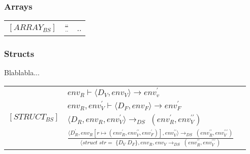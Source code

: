     
\noindent \subsubsection{Arrays}
    
\begin{semantik}
    \bgroup
    \def\arraystretch{3}
    \begin{table}[H]
    \centering
    \begin{tabular}{l c l}
        
        $[ARRAY_{BS}]$ & $
        \frac{..}
        {..}
        $ & .. \\
        
    \end{tabular}
    \end{table}
    \egroup
    \caption{Array}
    \label{sem:arrayvalue}
\end{semantik}
    
\noindent \subsubsection{Structs}
Blablabla... 
\begin{semantik}
    \bgroup
    \def\arraystretch{2}
    \begin{table}[H]
    \centering
    \begin{tabular}{l c l}
        
        \multirow{4}{*}{$[STRUCT_{BS}]$} &
        \multicolumn{1}{l}{$ env_R \vdash \langle D_V, env_V \rangle \rightarrow env_v^\prime$} \\
        
        & \multicolumn{1}{l}{$ env_R, env_V^\prime \vdash \langle D_F, env_F \rangle \rightarrow env_F^\prime $} \\
        
        & \multicolumn{1}{l}{$ \langle D_R, env_R, env_V^\prime \rangle \rightarrow_{DS}\;(env_R^\prime, env_V^{\prime\prime}) $} \\
        
        
        & \multicolumn{1}{l}{$ \frac
            {
              \langle D_R^\prime, env_R[r \mapsto (env_R^\prime, env_V^{\prime\prime}, env_F^\prime)], env_V^{\prime\prime} \rangle                                       \rightarrow_{DS}\;(env_R^{\prime\prime}, env_V^{\prime\prime\prime})
            }
            {
                \langle struct\;str =\;\{ D_V\;D_F \}, env_R, env_V \rightarrow_{DS}\;(env_R^{\prime\prime}, env_V^{\prime\prime\prime})
            } 
        $}
        
    \end{tabular}
    
    \end{table}
    \egroup
    \caption{Structs}
\label{sem:structs}
\end{semantik}

